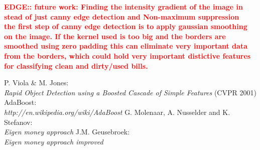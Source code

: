 \documentclass[11pt,twocolumn]{article}
\newcommand{\todo}[1]{\textcolor{red}{\textbf{#1}}}
\newcommand{\tit}{\textit}
\begin{document}
		\todo{EDGE::  future work: Finding the intensity gradient of the image in
		stead of just canny edge detection and Non-maximum suppression\\
		the first step of canny edge detection is to apply gaussian smoothing on the
		image. If the kernel used is too big and the borders are smoothed using zero
		padding this can eliminate very important data from the borders, which could
		hold very important distictive features for classifying clean and dirty/used
		bills.}
		
		 
		\begin{thebibliography}{3} 
				P. Viola \& M. Jones:\\
				\tit{Rapid Object Detection using a Boosted Cascade of Simple Features}
				(CVPR 2001)
				AdaBoost: \\
				\tit{http://en.wikipedia.org/wiki/AdaBoost}	
			G. Molenaar, A. Nusselder and K. Stefanov: \\
				\tit{Eigen money approach}
			 J.M. Geusebroek: \\
				\tit{Eigen money approach improved}		
		\end{thebibliography}
\end{document}
